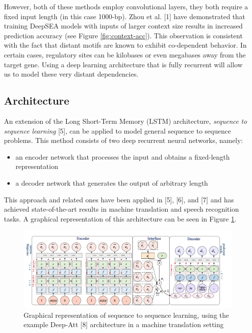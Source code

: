 \documentclass[twoside,11pt]{article}
\begin{document}
However, both of these methods employ convolutional layers, they both require a fixed input length (in this case 1000-bp).  Zhou et al. [1] have demonstrated that training DeepSEA models with inputs of larger context size results in increased prediction accuracy (see Figure \ref{fig:context-acc}). This observation is consistent with the fact that distant motifs are known to exhibit co-dependent behavior.  In certain cases, regulatory sites can be kilobases or even megabases away from the target gene.  Using a deep learning architecture that is fully recurrent will allow us to model these very distant dependencies.

\subsection{Architecture}
An extension of the Long Short-Term Memory (LSTM) architecture, {\it sequence to sequence learning} [5], can be applied to model general sequence to sequence problems.  This method consists of two deep recurrent neural networks,  namely:

\begin{itemize}
\item an encoder network that processes the input and obtains a fixed-length representation
\item a decoder network that generates the output of arbitrary length
\end{itemize}

This approach and related ones have been applied in [5], [6], and [7] and has achieved state-of-the-art results in machine translation and speech recognition tasks.  A graphical representation of this architecture can be seen in Figure \ref{fig:seq2seq}.

\begin{figure}[!htbp]
\centering
\includegraphics[width=\textwidth]{seq2seq_b.png}
\caption{Graphical representation of sequence to sequence learning, using the example Deep-Att [8] architecture in a machine translation setting}
\label{fig:seq2seq}
\end{figure}
\end{document}
